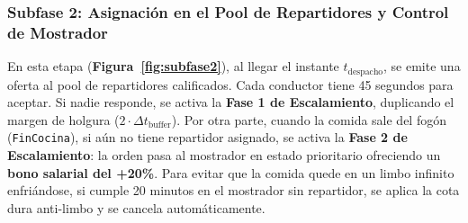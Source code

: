 \documentclass[11pt,a4paper]{article}
\begin{document}
\subsubsection{Subfase 2: Asignación en el Pool de Repartidores y Control de Mostrador}
En esta etapa (\textbf{Figura~\ref{fig:subfase2}}), al llegar el instante $t_{\text{despacho}}$, se emite una oferta al pool de repartidores calificados. Cada conductor tiene 45 segundos para aceptar. Si nadie responde, se activa la \textbf{Fase 1 de Escalamiento}, duplicando el margen de holgura ($2 \cdot \Delta t_{\text{buffer}}$). Por otra parte, cuando la comida sale del fogón (\texttt{FinCocina}), si aún no tiene repartidor asignado, se activa la \textbf{Fase 2 de Escalamiento}: la orden pasa al mostrador en estado prioritario ofreciendo un \textbf{bono salarial del +20\%}. Para evitar que la comida quede en un limbo infinito enfriándose, si cumple 20 minutos en el mostrador sin repartidor, se aplica la cota dura anti-limbo y se cancela automáticamente.
\end{document}
